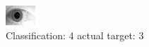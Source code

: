 \begin{figure}[h!]
\begin{center}
\includegraphics[width=0.60\columnwidth]{figures/ID1907_class_4_target_3.png}
\end{center}
\caption{ Classification: 4 actual target: 3}
\label{fig:ID1907_class_4_target_3}
\end{figure}
